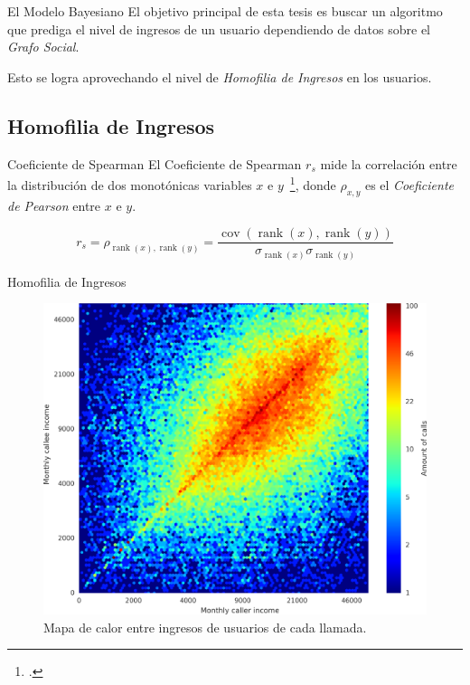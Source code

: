 \documentclass[usenames,dvipsnames,table]{beamer}
\DeclareMathOperator{\rank}{rank}
\DeclareMathOperator{\cov}{cov}
\begin{document}
\begin{frame}{El Modelo Bayesiano}
	El objetivo principal de esta tesis es buscar un algoritmo que prediga el nivel de ingresos de un usuario dependiendo de datos sobre el \emph{Grafo Social}.

	Esto se logra aprovechando el nivel de \emph{Homofilia de Ingresos} en los usuarios.
\end{frame}


\subsection{Homofilia de Ingresos}

\begin{frame}{Coeficiente de Spearman}
	El Coeficiente de Spearman $r_s$ mide la correlación entre la distribución de dos monotónicas variables $x$ e $y$~\footcite{statistical_analysis}, donde $\rho_{x, y}$ es el \emph{Coeficiente de Pearson} entre $x$ e $y$.


	\begin{equation*}
		r_s = \rho_{\rank\left(x\right), \rank\left(y\right)} = \frac{\cov\left(\rank\left(x\right), \rank\left(y\right)\right)}{\sigma_{\rank(x)} \sigma_{\rank(y)}}
	\end{equation*}

\end{frame}

\begin{frame}{Homofilia de Ingresos}
	\begin{figure}
		\includegraphics[width=.8\framewidth]{heatmap.png}
		\caption{Mapa de calor entre ingresos de usuarios de cada llamada.}
	\end{figure}
\end{frame}
\end{document}
